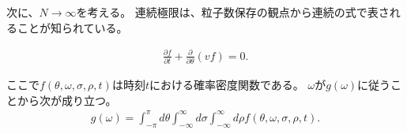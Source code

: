 \documentclass{jsarticle}
\begin{document}
次に、$N\to\infty$を考える。
連続極限は、粒子数保存の観点から連続の式で表されることが知られている。
\begin{framed}
\begin{align}
\frac{\partial f}{\partial t}+\frac{\partial}{\partial \theta}(vf)=0.
\end{align}
\end{framed}
ここで$f(\theta,\omega,\sigma,\rho,t)$は時刻$t$における確率密度関数である。
$\omega$が$g(\omega)$に従うことから次が成り立つ。
\begin{align}
g(\omega)=\int_{-\pi}^{\pi}d\theta\int_{-\infty}^{\infty}d\sigma\int_{-\infty}^{\infty}d\rho f(\theta,\omega,\sigma,\rho,t).
\end{align}






\end{document}
